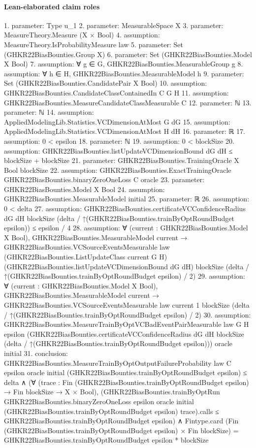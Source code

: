 \documentclass[10pt]{article}
\begin{document}
\paragraph{Lean-elaborated claim roles}\begin{ReviewVerbatim}
1. parameter: Type u_1
2. parameter: MeasurableSpace X
3. parameter: MeasureTheory.Measure (X × Bool)
4. assumption: MeasureTheory.IsProbabilityMeasure law
5. parameter: Set (GHKR22BiasBounties.Group X)
6. parameter: Set (GHKR22BiasBounties.Model X Bool)
7. assumption: ∀ g ∈ G, GHKR22BiasBounties.MeasurableGroup g
8. assumption: ∀ h ∈ H, GHKR22BiasBounties.MeasurableModel h
9. parameter: Set (GHKR22BiasBounties.CandidatePair X Bool)
10. assumption: GHKR22BiasBounties.CandidateClassContainedIn C G H
11. assumption: GHKR22BiasBounties.MeasureCandidateClassMeasurable C
12. parameter: ℕ
13. parameter: ℕ
14. assumption: AppliedModelingLib.Statistics.VCDimensionAtMost G dG
15. assumption: AppliedModelingLib.Statistics.VCDimensionAtMost H dH
16. parameter: ℝ
17. assumption: 0 < epsilon
18. parameter: ℕ
19. assumption: 0 < blockSize
20. assumption: GHKR22BiasBounties.listUpdateVCDimensionBound dG dH ≤ blockSize + blockSize
21. parameter: GHKR22BiasBounties.TrainingOracle X Bool blockSize
22. assumption: GHKR22BiasBounties.ExactTrainingOracle GHKR22BiasBounties.binaryZeroOneLoss C oracle
23. parameter: GHKR22BiasBounties.Model X Bool
24. assumption: GHKR22BiasBounties.MeasurableModel initial
25. parameter: ℝ
26. assumption: 0 < delta
27. assumption: GHKR22BiasBounties.certificateVCConfidenceRadius dG dH blockSize
    (delta / ↑(GHKR22BiasBounties.trainByOptRoundBudget epsilon)) ≤
  epsilon / 4
28. assumption: ∀ (current : GHKR22BiasBounties.Model X Bool),
  GHKR22BiasBounties.MeasurableModel current →
    GHKR22BiasBounties.VCSourceEventsMeasurable law (GHKR22BiasBounties.ListUpdateClass current G H)
      (GHKR22BiasBounties.listUpdateVCDimensionBound dG dH) blockSize
      (delta / ↑(GHKR22BiasBounties.trainByOptRoundBudget epsilon) / 2)
29. assumption: ∀ (current : GHKR22BiasBounties.Model X Bool),
  GHKR22BiasBounties.MeasurableModel current →
    GHKR22BiasBounties.VCSourceEventsMeasurable law {current} 1 blockSize
      (delta / ↑(GHKR22BiasBounties.trainByOptRoundBudget epsilon) / 2)
30. assumption: GHKR22BiasBounties.MeasureTrainByOptVCBadEventPairMeasurable law G H epsilon
  (GHKR22BiasBounties.certificateVCConfidenceRadius dG dH blockSize
    (delta / ↑(GHKR22BiasBounties.trainByOptRoundBudget epsilon)))
  oracle initial
31. conclusion: GHKR22BiasBounties.MeasureTrainByOptOutputFailureProbability law C epsilon oracle initial
      (GHKR22BiasBounties.trainByOptRoundBudget epsilon) ≤
    delta ∧
  (∀ (trace : Fin (GHKR22BiasBounties.trainByOptRoundBudget epsilon) → Fin blockSize → X × Bool),
      (GHKR22BiasBounties.trainByOptRun GHKR22BiasBounties.binaryZeroOneLoss epsilon oracle initial
            (GHKR22BiasBounties.trainByOptRoundBudget epsilon) trace).calls ≤
        GHKR22BiasBounties.trainByOptRoundBudget epsilon) ∧
    Fintype.card (Fin (GHKR22BiasBounties.trainByOptRoundBudget epsilon) × Fin blockSize) =
      GHKR22BiasBounties.trainByOptRoundBudget epsilon * blockSize
\end{ReviewVerbatim}
\end{document}
